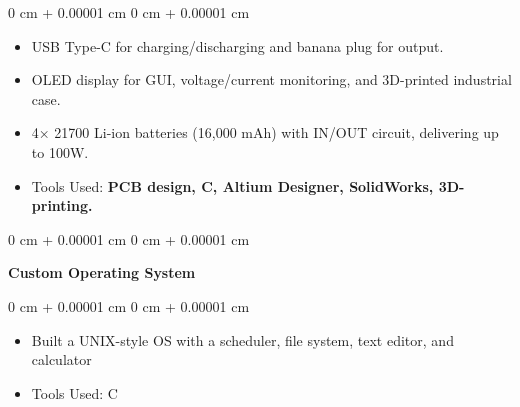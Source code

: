 \documentclass[10pt, letterpaper]{article}
\newenvironment{highlights}{
    \begin{itemize}[
        topsep=0.10 cm,
        parsep=0.10 cm,
        partopsep=0pt,
        itemsep=0pt,
        leftmargin=0 cm + 10pt
    ]
}{
    \end{itemize}
} %
\newenvironment{onecolentry}{
    \begin{adjustwidth}{
        0 cm + 0.00001 cm
    }{
        0 cm + 0.00001 cm
    }
}{
    \end{adjustwidth}
} %
\newenvironment{twocolentry}[2][]{
    \onecolentry
    \def\secondColumn{#2}
    \setcolumnwidth{\fill, 4.5 cm}
    \begin{paracol}{2}
}{
    \switchcolumn \raggedleft \secondColumn
    \end{paracol}
    \endonecolentry
} %
\begin{document}
\vspace{0.10 cm}
\begin{onecolentry}
      \begin{highlights}
            \item USB Type-C for charging/discharging and banana plug for output.
            \item OLED display for GUI, voltage/current monitoring, and 3D-printed industrial
            case.
            \item 4× 21700 Li-ion batteries (16,000 mAh) with IN/OUT circuit, delivering up to 100W.
            \item Tools Used:\textbf{ PCB design, C, Altium Designer, SolidWorks, 3D-printing.}
      \end{highlights}
\end{onecolentry}

\vspace{0.4 cm}
\begin{twocolentry}{
            2002
      }
      \textbf{Custom Operating System}\end{twocolentry}

\vspace{0.10 cm}
\begin{onecolentry}
      \begin{highlights}
            \item Built a UNIX-style OS with a scheduler, file system, text editor, and
            calculator
            \item Tools Used: C
      \end{highlights}
\end{onecolentry}
\end{document}
